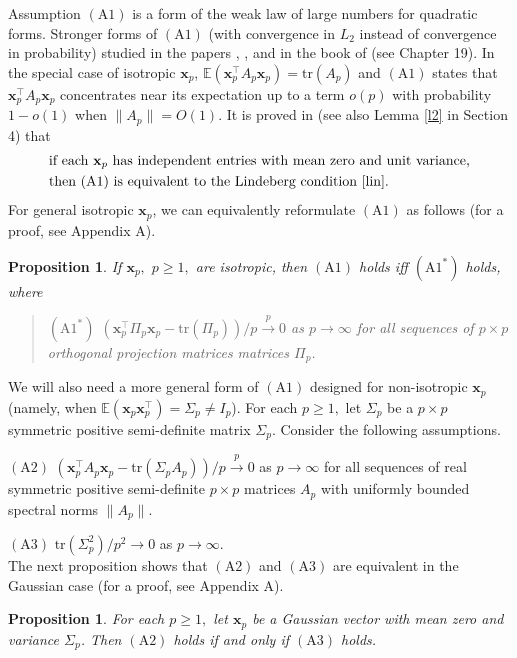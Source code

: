 \documentclass[12pt, a4paper]{article}
\newcommand\x{\mathbf x}
\newcommand\pto{\stackrel p\rightarrow}
\newcommand\e{{\mathbb E}}
\newcommand\tr{{\mathrm{tr}}}
\newtheorem{proposition}[theorem]{Proposition}%
\begin{document}
Assumption $(\mathrm A1)$ is a form of the weak law of large numbers for quadratic forms. Stronger forms of $(\mathrm A1)$   (with convergence in $L_2$ instead of convergence in probability) studied in the papers \cite{BZ}, \cite{PP}, and in the book of \cite{PS} (see Chapter 19). In the special case of isotropic $\x_p$,   $\e (\x_p^\top A_p\x_p)=\tr( A_p)$ and $(\mathrm A1)$  states  that $\x_p^\top A_p\x_p$ concentrates near its expectation up to a term $o(p)$ with probability $1-o(1)$ when $\|A_p\|=O(1)$. It  is proved in \cite{Y1} (see also Lemma \ref{l2} in Section 4) that 
\begin{align} \label{equiv}
&\text{if each $\x_p$ has independent entries with mean zero and unit variance,}\nonumber\\
&\text{then $(\mathrm A1)$ is equivalent to the Lindeberg condition \eqref{lin}.}
\end{align}  For general isotropic $\x_p$, we can equivalently reformulate $(\mathrm A1)$ as follows (for a proof, see Appendix A). 
\begin{proposition}\label{p2}
If $\x_p,$ $p\geqslant 1,$ are isotropic, then $(\mathrm A1 )$ holds iff $(\mathrm A1^*)$ holds, where 
 \begin{quote}
$(\mathrm A1^*)$  $(\x_p^\top \Pi_p\x_p-\tr( \Pi_p))/p\pto 0$ as $p\to\infty$ for all sequences of  $p\times p$ orthogonal projection matrices matrices $\Pi_p$. 
 \end{quote}
\end{proposition}

We  will also need a more general form of  $(\text{A1})$ designed for non-isotropic $\x_p$ (namely, when $\e( \x_p\x_p^\top)=\Sigma_p\neq I_p$). For each $p\geqslant 1,$ let $\Sigma_p$ be  a $p\times p$ symmetric positive semi-definite matrix $\Sigma_p$. Consider the following assumptions.

$(\text{A2})$  $(\x_p^\top A_p\x_p-\tr(\Sigma_p A_p))/p\pto 0$ as $p\to\infty$ for all sequences of real symmetric positive semi-definite $p\times p$  matrices $A_p$ with uniformly bounded spectral norms $\|A_p\|$. 

$(\text{A3})$  $\tr(\Sigma_p^2)/p^2\to 0$ as $p\to\infty$. 
\\
The next proposition shows that  $(\text{A2})$ and $(\text{A3})$ are equivalent in the Gaussian case (for a proof, see Appendix A). 
\begin{proposition}\label{p1}
For each $p\geqslant 1,$ let $\x_p$ be a Gaussian vector with mean zero and variance $\Sigma_p$. Then $(\mathrm A2)$ holds if and only if $(\mathrm A3)$ holds. 
\end{proposition} 
\end{document}
